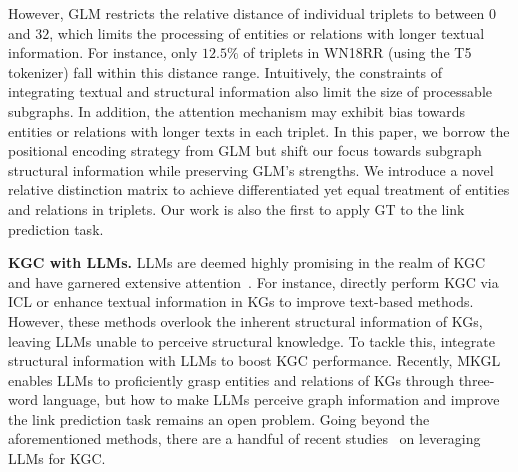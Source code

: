 However, GLM restricts the relative distance of individual triplets to between $0$ and $32$, which limits the processing of entities or relations with longer textual information. 
For instance, only $12.5\%$ of triplets in WN18RR (using the T5 tokenizer) fall within this distance range. 
Intuitively, the constraints of integrating textual and structural information also limit the size of processable subgraphs.
In addition, the attention mechanism may exhibit bias towards entities or relations with longer texts in each triplet. 
In this paper, we borrow the positional encoding strategy from GLM but shift our focus towards subgraph structural information while preserving GLM's strengths. We introduce a novel relative distinction matrix to achieve differentiated yet equal treatment of entities and relations in triplets. 
Our work is also the first to apply GT to the link prediction task.



\textbf{KGC with LLMs.} 
LLMs are deemed highly promising in the realm of KGC and have garnered extensive attention~\cite{ren2024survey, yu2024automated, pan2024unifying, si2024selecting, luo2024let, si2025aligning}.
For instance, \cite{yao2023exploring, zhu2024llms, wei2024kicgpt, li2024contextualization, xu2024multi} directly perform KGC via ICL or enhance textual information in KGs to improve text-based methods. However, these methods overlook the inherent structural information of KGs, leaving LLMs unable to perceive structural knowledge. To tackle this, \cite{zhang2024making, liu2024can, yang2024enhancing} integrate structural information with LLMs to boost KGC performance. Recently, MKGL~\cite{guo2024mkgl} enables LLMs to proficiently grasp entities and relations of KGs through three-word language, but how to make LLMs perceive graph information and improve the link prediction task remains an open problem.
Going beyond the aforementioned methods, there are a handful of recent studies~\cite{li2024cosign, xue2024unlock, jiang2024kg} on leveraging LLMs for KGC.



